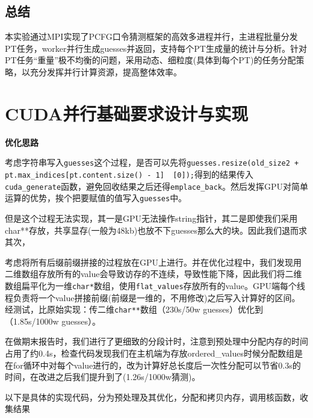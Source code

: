 \documentclass[a4paper]{article}
\begin{document}
\subsection{总结}
\par 本实验通过MPI实现了PCFG口令猜测框架的高效多进程并行，主进程批量分发PT任务，worker并行生成guesses并返回，支持每个PT生成量的统计与分析。针对PT任务“重量”极不均衡的问题，采用动态、细粒度(具体到每个PT)的任务分配策略，以充分发挥并行计算资源，提高整体效率。

\section{CUDA并行基础要求设计与实现}
\textbf{优化思路}
\par 考虑字符串写入\texttt{guesses}这个过程，是否可以先将\texttt{guesses.resize(old\_size2 + pt.max\_indices[pt.content.size() - 1]\,\,[0]);}得到的结果传入\texttt{cuda\_generate}函数，避免回收结果之后还得\texttt{emplace\_back}。然后发挥GPU对简单运算的优势，挨个把要赋值的值写入\texttt{guesses}中。
\par 但是这个过程无法实现，其一是GPU无法操作string指针，其二是即使我们采用char**存放，共享显存(一般为48kb)也放不下guesses那么大的块。因此我们退而求其次，
\par 考虑将所有后缀前缀拼接的过程放在GPU上进行。并在优化过程中，我们发现用二维数组存放所有的value会导致访存的不连续，导致性能下降，因此我们将二维数组扁平化为一维\texttt{char*}数组，使用\texttt{flat\_values}存放所有的value。GPU端每个线程负责将一个value拼接前缀(前缀是一维的，不用修改)之后写入计算好的区间。经测试，比原始实现：传二维\texttt{char**}数组（230s/50w guesses）优化到（1.85s/1000w guesses）。
\par 在做期末报告时，我们进行了更细致的分段计时，注意到预处理中分配内存的时间占用了约0.4s，检查代码发现我们在主机端为存放ordered\_values时候分配数组是在for循环中对每个value进行的，改为计算好总长度后一次性分配可以节省0.3s的时间，在改进之后我们提升到了(1.26s/1000w猜测)。
\par 以下是具体的实现代码，分为预处理及其优化，分配和拷贝内存，调用核函数，收集结果
\end{document}
